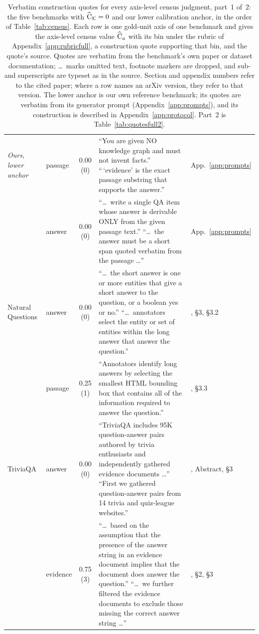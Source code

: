 \begin{table}[p]
\begin{tabular}{@{}p{}p{}cp{}p{}@{}}
\addlinespace[1.5pt]
\raggedright \textit{Ours, lower anchor} & passage & 0.00 (0) & ``You are given NO knowledge graph and must not invent facts.'' ``\,`evidence' is the exact passage substring that supports the answer.'' & \raggedright App.~\ref{app:prompts}\tabularnewline
 & answer & 0.00 (0) & ``\ldots\ write a single QA item whose answer is derivable ONLY from the given passage text.'' ``\ldots\ the answer must be a short span quoted verbatim from the passage \ldots'' & \raggedright App.~\ref{app:prompts}\tabularnewline
\addlinespace[1.5pt]
\raggedright Natural Questions & answer & 0.00 (0) & ``\ldots\ the short answer is one or more entities that give a short answer to the question, or a boolean yes or no.'' ``\ldots\ annotators select the entity or set of entities within the long answer that answer the question.'' & \raggedright \citealp{kwiatkowski2019nq}, \S3, \S3.2\tabularnewline
 & passage & 0.25 (1) & ``Annotators identify long answers by selecting the smallest HTML bounding box that contains all of the information required to answer the question.'' & \raggedright \citealp{kwiatkowski2019nq}, \S3.3\tabularnewline
\addlinespace[1.5pt]
\raggedright TriviaQA & answer & 0.00 (0) & ``TriviaQA includes 95K question-answer pairs authored by trivia enthusiasts and independently gathered evidence documents \ldots'' ``First we gathered question-answer pairs from 14 trivia and quiz-league websites.'' & \raggedright \citealp{joshi2017triviaqa}, Abstract, \S3\tabularnewline
 & evidence & 0.75 (3) & ``\ldots\ based on the assumption that the presence of the answer string in an evidence document implies that the document does answer the question.'' ``\ldots\ we further filtered the evidence documents to exclude those missing the correct answer string \ldots'' & \raggedright \citealp{joshi2017triviaqa}, \S2, \S3\tabularnewline
\bottomrule
\end{tabular}
\caption{Verbatim construction quotes for every axis-level census judgment, part~1 of~2: the five benchmarks with $\widehat{\mathrm{C}}_{\mathcal{K}}=0$ and our lower calibration anchor, in the order of Table~\ref{tab:census}. Each row is one gold-unit axis of one benchmark and gives the axis-level census value $\widehat{\mathrm{C}}_a$ with its bin under the rubric of Appendix~\ref{app:rubricfull}, a construction quote supporting that bin, and the quote's source. Quotes are verbatim from the benchmark's own paper or dataset documentation; \ldots\ marks omitted text, footnote markers are dropped, and sub- and superscripts are typeset as in the source. Section and appendix numbers refer to the cited paper; where a row names an arXiv version, they refer to that version. The lower anchor is our own reference benchmark; its quotes are verbatim from its generator prompt (Appendix~\ref{app:prompts}), and its construction is described in Appendix~\ref{app:protocol}. Part~2 is Table~\ref{tab:quotesfull2}.}
\label{tab:quotesfull1}
\end{table}

